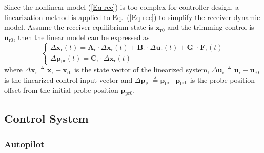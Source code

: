 Since the nonlinear model (\ref{Eq-rec}) is too complex for controller
design, a linearization method \cite{AirContrl} is applied to Eq.~(\ref{Eq-rec})
to simplify the receiver dynamic model. Assume the receiver equilibrium
state is $\mathbf{x}_{\text{r0}}$ and the trimming control is $\boldsymbol{u}_{\text{r0}}$,
then the linear model can be expressed as
\begin{equation}
\left\{ \begin{array}{l}
\Delta{\mathbf{{\dot{x}}}}_{\text{r}}\left(t\right)=\mathbf{A}_{\text{r}}\cdot\Delta{\mathbf{x}_{\text{r}}\left(t\right)}+\mathbf{B}_{\text{r}}\cdot\Delta\boldsymbol{u}_{\text{r}}\left(t\right)+\mathbf{G}_{\text{r}}\cdot{\mathbf{F}_{\text{r}}\left(t\right)}\\
\Delta\mathbf{p}{_{\text{pr}}}\left(t\right)=\mathbf{C}_{\text{r}}\cdot\Delta{\mathbf{x}_{\text{r}}}\left(t\right)
\end{array}\right.\label{Eq-rec1}
\end{equation}
where $\Delta{\mathbf{x}_{\text{r}}\triangleq\mathbf{x}_{\text{r}}-}\mathbf{x}_{\text{r0}}$
is the state vector of the linearized system, $\Delta\boldsymbol{u}_{\text{r}}\triangleq\boldsymbol{u}_{\text{r}}-\boldsymbol{u}_{\text{r0}}$
is the linearized control input vector and $\Delta\mathbf{p}${$_{\text{pr}}$}$\triangleq\mathbf{p}${$_{\text{pr}}$}$-\mathbf{p}{_{\text{pr0}}}$
is the probe position offset from the initial probe position $\mathbf{p}{_{\text{pr0}}}$.

\subsection{Control System}

\subsubsection{Autopilot}

